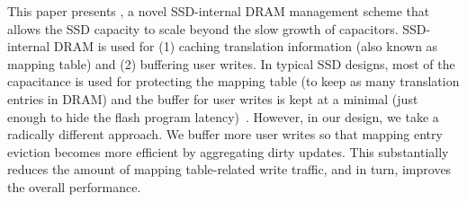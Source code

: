 This paper presents \ours{}, a novel SSD-internal DRAM management scheme 
that allows the SSD capacity to scale beyond the slow growth of capacitors. 
SSD-internal DRAM is used for 
(1) caching translation information (also known as mapping table) and (2) buffering user writes. 
In typical SSD designs, most of the capacitance is used for protecting the mapping table (to keep as many translation entries in DRAM) 
and the buffer for user writes is kept at a minimal (just enough to hide the flash program latency)~\cite{KangLMKO14sigmod}. 
However, in our design, we take a radically different approach. 
We buffer more user writes so that mapping entry eviction becomes more efficient by aggregating dirty updates. 
This substantially reduces the amount of mapping table-related write traffic, and in turn, improves the overall performance. 

